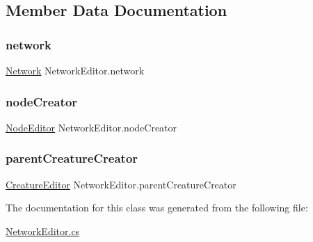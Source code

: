 \subsection{Member Data Documentation}
\mbox{\label{class_network_editor_ad7a7f511e42a332743dc2abb223ca2c4}} 
\subsubsection{\texorpdfstring{network}{network}}
{\footnotesize\ttfamily \mbox{\hyperlink{class_network}{Network}} Network\+Editor.\+network}

\mbox{\label{class_network_editor_a877324ecefb6e6371a0572fc4a57b116}} 
\subsubsection{\texorpdfstring{node\+Creator}{nodeCreator}}
{\footnotesize\ttfamily \mbox{\hyperlink{class_node_editor}{Node\+Editor}} Network\+Editor.\+node\+Creator}

\mbox{\label{class_network_editor_ac21fdc9f2b2211e5c79e05658d65b119}} 
\subsubsection{\texorpdfstring{parent\+Creature\+Creator}{parentCreatureCreator}}
{\footnotesize\ttfamily \mbox{\hyperlink{class_creature_editor}{Creature\+Editor}} Network\+Editor.\+parent\+Creature\+Creator}



The documentation for this class was generated from the following file\+:\begin{DoxyCompactItemize}
\item 
\mbox{\hyperlink{_network_editor_8cs}{Network\+Editor.\+cs}}\end{DoxyCompactItemize}
